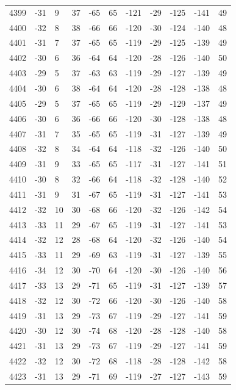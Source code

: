 \begin{table}[H]
\begin{tabular}{lllllllllll}
4399 & -31 & 9 & 37 & -65 & 65 & -121 & -29 & -125 & -141 & 49 \\
4400 & -32 & 8 & 38 & -66 & 66 & -120 & -30 & -124 & -140 & 48 \\
4401 & -31 & 7 & 37 & -65 & 65 & -119 & -29 & -125 & -139 & 49 \\
4402 & -30 & 6 & 36 & -64 & 64 & -120 & -28 & -126 & -140 & 50 \\
4403 & -29 & 5 & 37 & -63 & 63 & -119 & -29 & -127 & -139 & 49 \\
4404 & -30 & 6 & 38 & -64 & 64 & -120 & -28 & -128 & -138 & 48 \\
4405 & -29 & 5 & 37 & -65 & 65 & -119 & -29 & -129 & -137 & 49 \\
4406 & -30 & 6 & 36 & -66 & 66 & -120 & -30 & -128 & -138 & 48 \\
4407 & -31 & 7 & 35 & -65 & 65 & -119 & -31 & -127 & -139 & 49 \\
4408 & -32 & 8 & 34 & -64 & 64 & -118 & -32 & -126 & -140 & 50 \\
4409 & -31 & 9 & 33 & -65 & 65 & -117 & -31 & -127 & -141 & 51 \\
4410 & -30 & 8 & 32 & -66 & 64 & -118 & -32 & -128 & -140 & 52 \\
4411 & -31 & 9 & 31 & -67 & 65 & -119 & -31 & -127 & -141 & 53 \\
4412 & -32 & 10 & 30 & -68 & 66 & -120 & -32 & -126 & -142 & 54 \\
4413 & -33 & 11 & 29 & -67 & 65 & -119 & -31 & -127 & -141 & 53 \\
4414 & -32 & 12 & 28 & -68 & 64 & -120 & -32 & -126 & -140 & 54 \\
4415 & -33 & 11 & 29 & -69 & 63 & -119 & -31 & -127 & -139 & 55 \\
4416 & -34 & 12 & 30 & -70 & 64 & -120 & -30 & -126 & -140 & 56 \\
4417 & -33 & 13 & 29 & -71 & 65 & -119 & -31 & -127 & -139 & 57 \\
4418 & -32 & 12 & 30 & -72 & 66 & -120 & -30 & -126 & -140 & 58 \\
4419 & -31 & 13 & 29 & -73 & 67 & -119 & -29 & -127 & -141 & 59 \\
4420 & -30 & 12 & 30 & -74 & 68 & -120 & -28 & -128 & -140 & 58 \\
4421 & -31 & 13 & 29 & -73 & 67 & -119 & -29 & -127 & -141 & 59 \\
4422 & -32 & 12 & 30 & -72 & 68 & -118 & -28 & -128 & -142 & 58 \\
4423 & -31 & 13 & 29 & -71 & 69 & -119 & -27 & -127 & -143 & 59 \\

\end{tabular}
\end{table}
